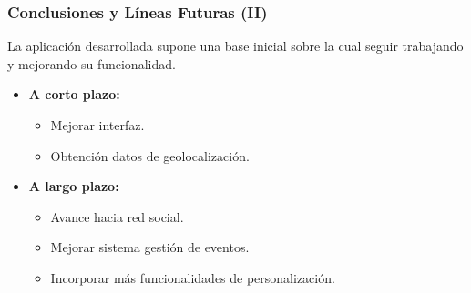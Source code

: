 \documentclass[usenames,dvipsnames]{beamer}
\begin{document}
\begin{frame}
\frametitle{Conclusiones y Líneas Futuras (II)}
La aplicación desarrollada supone una base inicial sobre la cual seguir trabajando y mejorando su funcionalidad.
\vspace{0.5cm}
\begin{itemize}

	\item \textbf{A corto plazo:}
		\begin{itemize}
			\item Mejorar interfaz.
			\item Obtención datos de geolocalización.
		\end{itemize}
	\vspace{0.5cm}
	\item \textbf{A largo plazo:}
		\begin{itemize}
			\item Avance hacia red social.
			\item Mejorar sistema gestión de eventos.
			\item Incorporar más funcionalidades de personalización.
		\end{itemize}
\end{itemize}
\end{frame}
 
 

\begin{frame}
\centering
{}
\maketitle


\end{frame}
                
                  
\end{document}

